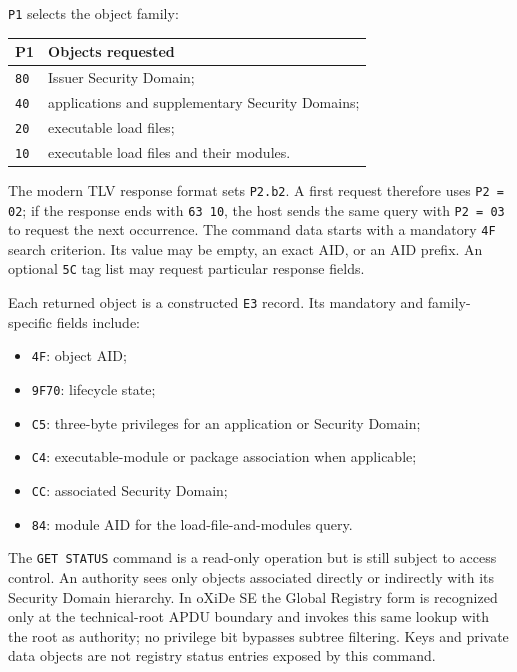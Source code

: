 \texttt{P1} selects the object family:

\begin{center}
\begin{tabular}{p{}p{}}
\textbf{P1} & \textbf{Objects requested} \\
\hline
\texttt{80} & Issuer Security Domain; \\
\texttt{40} & applications and supplementary Security Domains; \\
\texttt{20} & executable load files; \\
\texttt{10} & executable load files and their modules.
\end{tabular}
\end{center}

The modern TLV response format sets \texttt{P2.b2}. A first request therefore
uses \texttt{P2 = 02}; if the response ends with \texttt{63 10}, the host sends
the same query with \texttt{P2 = 03} to request the next occurrence. The
command data starts with a mandatory \texttt{4F} search criterion. Its value
may be empty, an exact AID, or an AID prefix. An optional \texttt{5C} tag list
may request particular response fields.

Each returned object is a constructed \texttt{E3} record. Its mandatory and
family-specific fields include:
\begin{itemize}
\item \texttt{4F}: object AID;
\item \texttt{9F70}: lifecycle state;
\item \texttt{C5}: three-byte privileges for an application or Security
      Domain;
\item \texttt{C4}: executable-module or package association when applicable;
\item \texttt{CC}: associated Security Domain;
\item \texttt{84}: module AID for the load-file-and-modules query.
\end{itemize}

The \texttt{GET STATUS} command is a read-only operation but is still subject
to access control. An authority sees only objects associated directly or
indirectly with its Security Domain hierarchy. In oXiDe SE the Global Registry
form is recognized only at the technical-root APDU boundary and invokes this
same lookup with the root as authority; no privilege bit bypasses subtree
filtering. Keys and private data objects are not registry status entries
exposed by this command.

